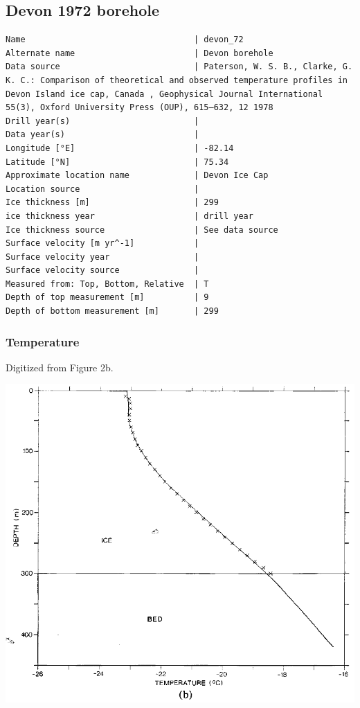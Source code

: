 \documentclass[article,a4paper,times,11pt,twoside]{article}
\begin{document}
\subsection{Devon 1972 borehole}
\label{sec:orgaec8f6d}
\begin{verbatim}
Name                                  | devon_72
Alternate name                        | Devon borehole
Data source                           | Paterson, W. S. B., Clarke, G. K. C.: Comparison of theoretical and observed temperature profiles in Devon Island ice cap, Canada , Geophysical Journal International 55(3), Oxford University Press (OUP), 615–632, 12 1978 
Drill year(s)                         | 
Data year(s)                          | 
Longitude [°E]                        | -82.14
Latitude [°N]                         | 75.34
Approximate location name             | Devon Ice Cap
Location source                       | 
Ice thickness [m]                     | 299
ice thickness year                    | drill year
Ice thickness source                  | See data source
Surface velocity [m yr^-1]            | 
Surface velocity year                 | 
Surface velocity source               | 
Measured from: Top, Bottom, Relative  | T
Depth of top measurement [m]          | 9
Depth of bottom measurement [m]       | 299
\end{verbatim}


\subsubsection{Temperature}
\label{sec:orgfdea85b}

Digitized from \textcite{paterson_1978} Figure 2b.

\begin{center}
\includegraphics[width=.9\linewidth]{devon_72/paterson_1978_fig2b.png}
\end{center}
\end{document}
